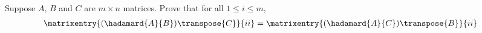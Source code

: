 Suppose $A$, $B$ and $C$ are $m \times n$ matrices. Prove that for all $1 \leq i \leq m$,
\begin{align*}
\matrixentry{(\hadamard{A}{B})\transpose{C}}{ii}
&=
\matrixentry{(\hadamard{A}{C})\transpose{B}}{ii}
\end{align*}